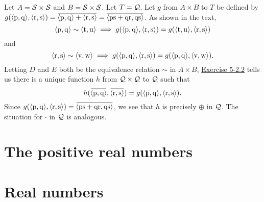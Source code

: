 \begin{solution}
Let $A=\mathcal{S}\times\mathcal{S}$ and $B=\mathcal{S}\times\mathcal{S}$. Let $T = \mathcal{Q}$.
Let $g$ from $A\times B$ to $T$ be defined by $g(\aprn{\mrm p,\mrm q}, \aprn{\mrm r,\mrm s})
=\overbar{\aprn{\mrm p,\mrm q} + \aprn{\mrm r,\mrm s}}=\overbar{\aprn{\mrm{ps}+\mrm{qr},\mrm{qs}}}$.
As shown in the text,
\[
\aprn{\mrm p,\mrm q}\sim\aprn{\mrm t,\mrm u} \implies
g(\aprn{\mrm p,\mrm q}, \aprn{\mrm r,\mrm s})=g(\aprn{\mrm t,\mrm u}, \aprn{\mrm r,\mrm s})
\]
and
\[
\aprn{\mrm r,\mrm s}\sim\aprn{\mrm v,\mrm w}\implies
g(\aprn{\mrm p,\mrm q}, \aprn{\mrm r,\mrm s})=g(\aprn{\mrm p,\mrm q}, \aprn{\mrm v,\mrm w}).
\]
Letting $D$ and $E$ both be the equivalence relation $\sim$ in $A\times B$,
\hyperref[ex:5-2.2]{Exercise 5-2.2} tells us there is a unique function
$h$ from $\mathcal{Q}\times\mathcal{Q}$ to $\mathcal{Q}$ such that
\[h(\overbar{\aprn{\mrm p,\mrm q}},\overbar{\aprn{\mrm r,\mrm s}})=g(\aprn{\mrm p,\mrm q},\aprn{\mrm r,\mrm s}).\]
Since $g(\aprn{\mrm p,\mrm q},\aprn{\mrm r,\mrm s})=\overbar{\aprn{\mrm{ps}+\mrm{qr},\mrm{qs}}}$,
we see that $h$ is precisely $\oplus$ in $\mathcal{Q}$.
The situation for $\cdot$ in $\mathcal{Q}$ is analogous.
\end{solution}



\section{The positive real numbers}




\section{Real numbers}
